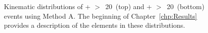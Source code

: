 \begin{figure}[h!]
\caption{Kinematic distributions of \phoonejet + \met$>$~20~\etUnits (top) and \photwojet + \met$>$~20~\etUnits (bottom) events using Method A. The beginning of Chapter~\ref{chp:Results} provides a description of the elements in these distributions.}
\label{fig:pjMetSetTwo}
\end{figure}
\clearpage

